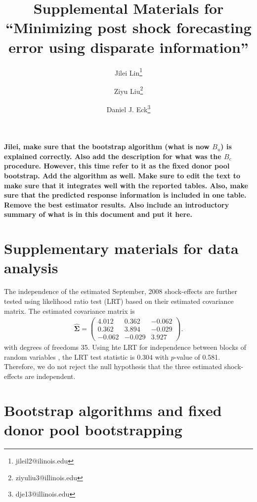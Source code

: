 \documentclass[11pt]{article}
\title{Supplemental Materials for ``Minimizing post shock forecasting error using disparate information''}
\author{Jilei Lin\thanks{jileil2@ilinois.edu}}
\author{Ziyu Liu\thanks{ziyuliu3@illinois.edu}}
\author{Daniel J. Eck\thanks{dje13@illinois.edu}}
\affil{Department of Statistics, University of Illinois at Urbana-Champaign}
\theoremstyle{definition}
\begin{document}
\maketitle

\textbf{Jilei, make sure that the bootstrap algorithm (what is now $B_u$) is explained correctly. Also add the description for what was the $B_c$ procedure. However, this time refer to it as the fixed donor pool bootstrap. Add the algorithm as well. Make sure to edit the text to make sure that it integrates well with the reported tables. Also, make sure that the predicted response information is included in one table. Remove the best estimator results. Also include an introductory summary of what is in this document and put it here.}



\section{Supplementary materials for data analysis}
\label{smfda}
The independence of the estimated September, 2008 shock-effects are further tested using likelihood ratio test (LRT) based on their estimated covariance matrix. The estimated covariance matrix is
\begin{align*}
  \hat{\mathbf{\Sigma}}=\left(\begin{array}{rrr}
    4.012 & 0.362 & -0.062 \\
    0.362 & 3.894 & -0.029 \\
    -0.062 & -0.029 & 3.927
  \end{array}\right).
\end{align*}
with degrees of freedoms 35. Using hte LRT for independence between blocks of random variables \citep[Section 10.2]{msos}, the LRT test statistic is $0.304$ with $p$-value of 0.581. Therefore, we do not reject  the null hypothesis that the three estimated shock-effects are independent.




\section{Bootstrap algorithms and fixed donor pool bootstrapping}
\end{document}
